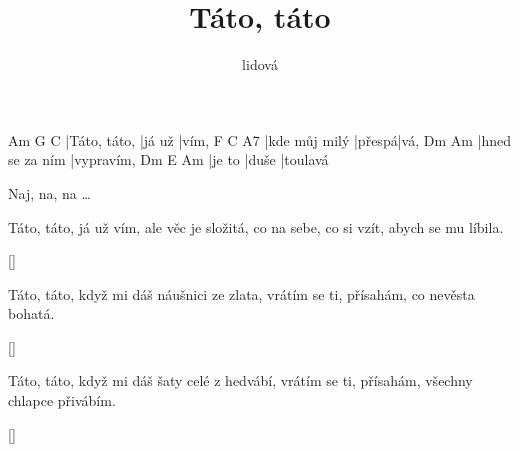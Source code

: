 \documentclass{song}
\title{Táto, táto}
\author{lidová}
\begin{document}
\strophe
Am           G      C
|Táto, táto, |já už |vím,
F             C      A7
|kde můj milý |přespá|vá,
Dm              Am
|hned se za ním |vypravím,
Dm     E     Am
|je to |duše |toulavá
\endstrophe

Naj, na, na \ldots
\endstrophe

\strophe*
Táto, táto, já už vím,
ale věc je složitá,
co na sebe, co si vzít,
abych se mu líbila.
\endstrophe

\ref{}

\strophe*
Táto, táto, když mi dáš
náušnici ze zlata,
vrátím se ti, přísahám,
co nevěsta bohatá.
\endstrophe

\ref{}

\strophe*
Táto, táto, když mi dáš
šaty celé z hedvábí,
vrátím se ti, přísahám,
všechny chlapce přivábím.
\endstrophe

\ref{}
\end{document}
